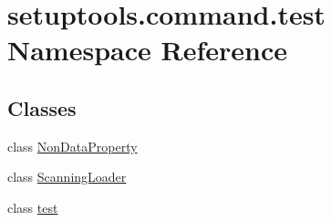 \hypertarget{namespacesetuptools_1_1command_1_1test}{}\section{setuptools.\+command.\+test Namespace Reference}
\label{namespacesetuptools_1_1command_1_1test}
\subsection*{Classes}
\begin{DoxyCompactItemize}
\item 
class \hyperlink{classsetuptools_1_1command_1_1test_1_1NonDataProperty}{Non\+Data\+Property}
\item 
class \hyperlink{classsetuptools_1_1command_1_1test_1_1ScanningLoader}{Scanning\+Loader}
\item 
class \hyperlink{classsetuptools_1_1command_1_1test_1_1test}{test}
\end{DoxyCompactItemize}
